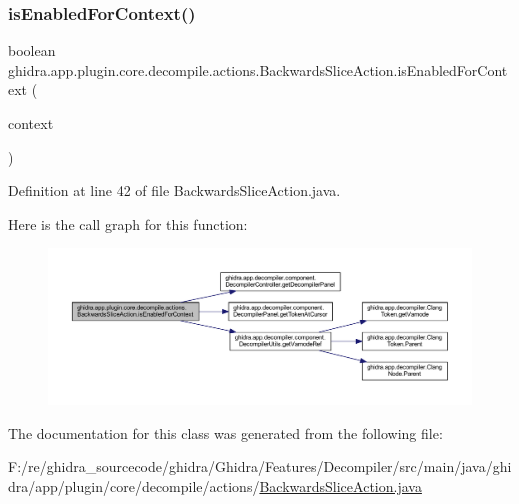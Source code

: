 \subsubsection{\texorpdfstring{isEnabledForContext()}{isEnabledForContext()}}
{\footnotesize\ttfamily boolean ghidra.\+app.\+plugin.\+core.\+decompile.\+actions.\+Backwards\+Slice\+Action.\+is\+Enabled\+For\+Context (\begin{DoxyParamCaption}\item[{Action\+Context}]{context }\end{DoxyParamCaption})\hspace{0.3cm}{\ttfamily [inline]}}



Definition at line 42 of file Backwards\+Slice\+Action.\+java.

Here is the call graph for this function\+:
\nopagebreak
\begin{figure}[H]
\begin{center}
\leavevmode
\includegraphics[width=350pt]{classghidra_1_1app_1_1plugin_1_1core_1_1decompile_1_1actions_1_1_backwards_slice_action_a2115a1a2187a64114301e01bca70c2f3_cgraph}
\end{center}
\end{figure}


The documentation for this class was generated from the following file\+:\begin{DoxyCompactItemize}
\item 
F\+:/re/ghidra\+\_\+sourcecode/ghidra/\+Ghidra/\+Features/\+Decompiler/src/main/java/ghidra/app/plugin/core/decompile/actions/\mbox{\hyperlink{_backwards_slice_action_8java}{Backwards\+Slice\+Action.\+java}}\end{DoxyCompactItemize}
